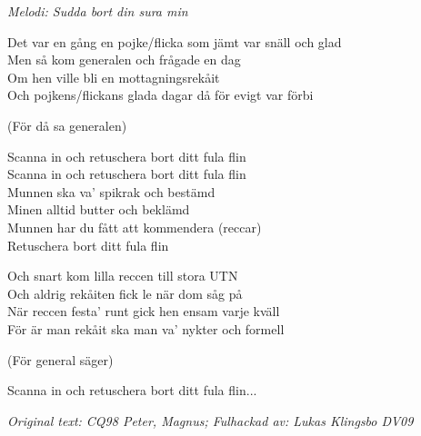 {\footnotesize\textit{Melodi: Sudda bort din sura min}}\par
\vspace{10pt}
Det var en gång en pojke/flicka som jämt var snäll och glad\\
Men så kom generalen och frågade en dag\\
Om hen ville bli en mottagningsrekåit\\
Och pojkens/flickans glada dagar då för evigt var förbi\par
\vspace{10pt}
(För då sa generalen)\par
\vspace{10pt}
Scanna in och retuschera bort ditt fula flin\\
Scanna in och retuschera bort ditt fula flin\\
Munnen ska va' spikrak och bestämd\\
Minen alltid butter och beklämd\\
Munnen har du fått att kommendera (reccar)\\
Retuschera bort ditt fula flin\par
\vspace{10pt}
Och snart kom lilla reccen till stora UTN\\
Och aldrig rekåiten fick le när dom såg på\\
När reccen festa' runt gick hen ensam varje kväll\\
För är man rekåit ska man va' nykter och formell\par
\vspace{10pt}
(För general säger)\par
\vspace{10pt}
Scanna in och retuschera bort ditt fula flin...\par
\vspace{10pt}
{\footnotesize\textit{Original text: CQ98 Peter, Magnus; Fulhackad av: Lukas Klingsbo DV09}}
